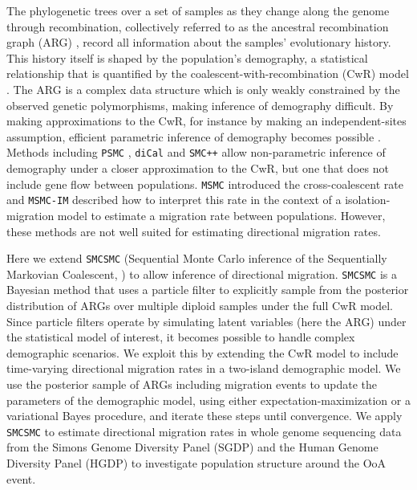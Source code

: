 The phylogenetic trees over a set of samples as they change along the genome through recombination, collectively referred to as the ancestral recombination graph (ARG) \cite{Griffiths1997a,Rasmussen2014}, record all information about the samples' evolutionary history.  This history itself is shaped by the population's demography, a statistical relationship that is quantified by the coalescent-with-recombination (CwR) model \cite{Griffiths1997a}.  The ARG is a complex data structure which is only weakly constrained by the observed genetic polymorphisms, making inference of demography difficult. By making approximations to the CwR, for instance by making an independent-sites assumption, efficient parametric inference of demography becomes possible \cite{Excoffier2013,McVean2005}.  Methods including {\tt PSMC} \cite{Li2011}, {\tt diCal} \cite{Steinrucken2015} and {\tt SMC++} \cite{Terhorst2015} allow non-parametric inference of demography under a closer approximation to the CwR, but one that does not include gene flow between populations. {\tt MSMC} \cite{Schiffels2014} introduced the cross-coalescent rate and {\tt MSMC-IM} described how to interpret this rate in the context of a isolation-migration model to estimate a migration rate between populations\cite{Wang2019a}. However, these methods are not well suited for estimating directional migration rates. 

Here we extend {\tt SMCSMC} (Sequential Monte Carlo inference of the Sequentially Markovian Coalescent, \cite{Henderson2018}) to allow inference of directional migration.  {\tt SMCSMC} is a Bayesian method that uses a particle filter to explicitly sample from the posterior distribution of ARGs over multiple diploid samples under the full CwR model.
Since particle filters operate by simulating latent variables (here the ARG) under the statistical model of interest, it becomes possible to handle complex demographic scenarios.  We exploit this by extending the CwR model to include time-varying directional migration rates in a two-island demographic model.  We use the posterior sample of ARGs including migration events to update the parameters of the demographic model, using either expectation-maximization or a variational Bayes procedure, and iterate these steps until convergence.   We apply {\tt SMCSMC} to estimate directional migration rates in whole genome sequencing data from the Simons Genome Diversity Panel (SGDP) \cite{Mallick2016} and the Human Genome Diversity Panel (HGDP) \cite{Bergstrom2019} to investigate population structure around the OoA event.

